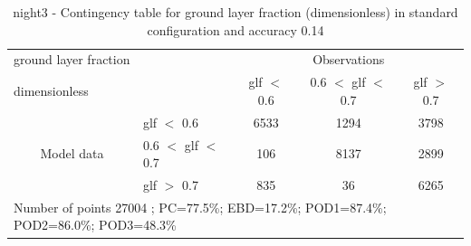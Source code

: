 \begin{table}[p!]
\begin{center}
\begin{tabular}{llccc}
\hline
{ground layer fraction}                                       &                                                    & \multicolumn{3}{c}{Observations}                 \\
{dimensionless}                                       &                             & glf $<$ 0.6   & 0.6 $<$ glf $<$ 0.7 & glf $>$ 0.7 \\
\hline
\multicolumn{1}{c}{\multirow{3}{*}{Model data}}  & glf $<$ 0.6             & 6533                & 1294                       & 3798              \\
                                                 & 0.6  $<$ glf $<$ 0.7 & 106                & 8137                       & 2899              \\
                                                 & glf $>$ 0.7             & 835                & 36                       & 6265              \\
\hline
\multicolumn{5}{l}{ Number of points        27004 ; PC=77.5\%; EBD=17.2\%; POD1=87.4\%; POD2=86.0\%; POD3=48.3\%}
\end{tabular}
\end{center}
\caption{night3 - Contingency table for  ground layer fraction (dimensionless) in standard configuration and accuracy 0.14}
\label{tab:contingencyglfBEF:night3}
\end{table}
